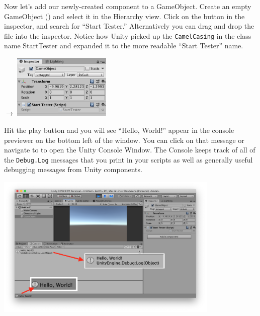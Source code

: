 \documentclass[11pt]{article}
\begin{document}
Now let's add our newly-created component to a GameObject.  Create an empty GameObject 
() and select it in the Hierarchy view.  Click on the 
button in the inspector, and search for ``Start Tester.''  Alternatively you can drag and drop the
 file into the inspector.  Notice how Unity picked up the \lstinline|CamelCasing|
in the class name StartTester and expanded it to the more readable ``Start Tester'' name.
\begin{center}
 $\rightarrow$
\includegraphics[width=0.35\textwidth]{add-component-2}
\end{center}

Hit the play button and you will see ``Hello, World!'' appear in the console previewer on the bottom
left of the window.  You can click on that message or navigate to  to
open the Unity Console Window.  The Console keeps track of all of the \lstinline|Debug.Log| messages
that you print in your scripts as well as generally useful debugging messages from Unity components.
\begin{center}
\includegraphics[width=0.8\textwidth]{start-tester} 
\end{center}
\end{document}
